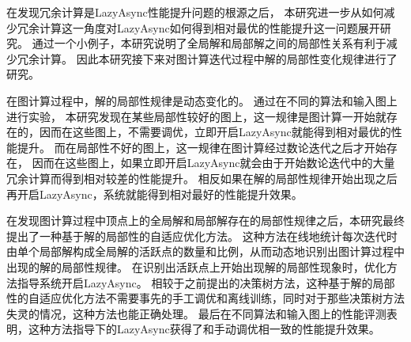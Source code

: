 在发现冗余计算是LazyAsync性能提升问题的根源之后，
本研究进一步从如何减少冗余计算这一角度对LazyAsync如何得到相对最优的性能提升这一问题展开研究。
通过一个小例子，本研究说明了全局解和局部解之间的局部性关系有利于减少冗余计算。
因此本研究接下来对图计算迭代过程中解的局部性变化规律进行了研究。



在图计算过程中，解的局部性规律是动态变化的。
通过在不同的算法和输入图上进行实验，
本研究发现在某些局部性较好的图上，这一规律是图计算一开始就存在的，因而在这些图上，不需要调优，立即开启LazyAsync就能得到相对最优的性能提升。
而在局部性不好的图上，这一规律在图计算经过数论迭代之后才开始存在，
因而在这些图上，如果立即开启LazyAsync就会由于开始数论迭代中的大量冗余计算而得到相对较差的性能提升。
相反如果在解的局部性规律开始出现之后再开启LazyAsync，系统就能得到相对最好的性能提升效果。


在发现图计算过程中顶点上的全局解和局部解存在的局部性规律之后，本研究最终提出了一种基于解的局部性的自适应优化方法。
这种方法在线地统计每次迭代时由单个局部解构成全局解的活跃点的数量和比例，从而动态地识别出图计算过程中出现的解的局部性规律。
在识别出活跃点上开始出现解的局部性现象时，优化方法指导系统开启LazyAsync。
相较于之前提出的决策树方法，这种基于解的局部性的自适应优化方法不需要事先的手工调优和离线训练，同时对于那些决策树方法失灵的情况，这种方法也能正确处理。
最后在不同算法和输入图上的性能评测表明，这种方法指导下的LazyAsync获得了和手动调优相一致的性能提升效果。

